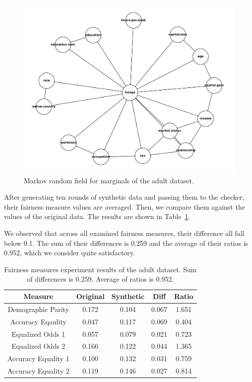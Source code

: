 \documentclass[manuscript,screen,review,anonymous]{acmart}
\begin{document}
\begin{figure}[h]
\centering
\includegraphics[width=\linewidth]{adult_mst}
\caption{Markov random field for marginals of the adult dataset.}
\label{fig:adult_mst}
\end{figure}

After generating ten rounds of synthetic data and passing them to the checker, their fairness measure values are averaged. Then, we compare them against the values of the original data. The results are shown in Table~\ref{tab:adult_score}.

We observed that across all examined fairness measures, their difference all fall below 0.1. The sum of their differences is 0.259 and the average of their ratios is 0.952, which we consider quite satisfactory.

\begin{table}[h]
\caption{Fairness measures experiment results of the adult dataset. Sum of differences is 0.259. Average of ratios is 0.952.}
\label{tab:adult_score}
\begin{tabular}{ccccc}
\toprule
\textbf{Measure} & \textbf{Original} & \textbf{Synthetic} & \textbf{Diff} & \textbf{Ratio} \\
\midrule
Demographic Parity  & 0.172 & 0.104 & 0.067 & 1.651 \\
Accuracy Eqaulity   & 0.047 & 0.117 & 0.069 & 0.404 \\
Equalized Odds 1    & 0.057 & 0.079 & 0.021 & 0.723 \\
Equalized Odds 2    & 0.166 & 0.122 & 0.044 & 1.365 \\
Accuracy Equality 1 & 0.100 & 0.132 & 0.031 & 0.759 \\
Accuracy Equality 2 & 0.119 & 0.146 & 0.027 & 0.814 \\
\bottomrule
\end{tabular}
\end{table}
\end{document}
